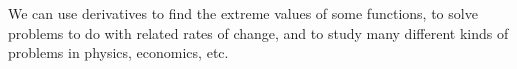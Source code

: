 We can use derivatives to find the extreme values of some functions, to 
solve problems to do with related rates of change, and to study many different
kinds of problems in physics, economics, etc.